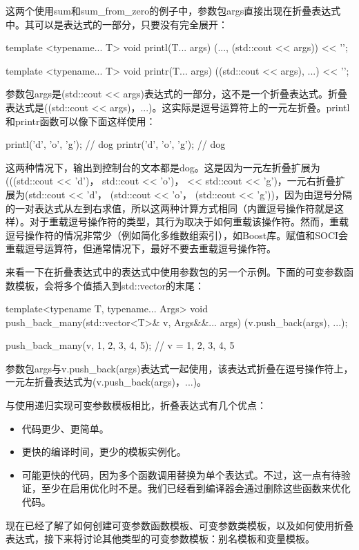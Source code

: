 这两个使用sum和sum\_from\_zero的例子中，参数包args直接出现在折叠表达式中。其可以是表达式的一部分，只要没有完全展开：

\begin{cpp}
template <typename... T>
void printl(T... args)
{
	(..., (std::cout << args)) << '\n';
}

template <typename... T>
void printr(T... args)
{
	((std::cout << args), ...) << '\n';
}
\end{cpp}

参数包args是(std::cout <{}< args)表达式的一部分，这不是一个折叠表达式。折叠表达式是((std::cout <{}< args)，...)。这实际是逗号运算符上的一元左折叠。printl和printr函数可以像下面这样使用：

\begin{cpp}
printl('d', 'o', 'g'); // dog
printr('d', 'o', 'g'); // dog
\end{cpp}

这两种情况下，输出到控制台的文本都是dog。这是因为一元左折叠扩展为(((std::cout <{}< 'd')， std::cout <{}< 'o')， << std::cout <{}< 'g')，一元右折叠扩展为(std::cout <{}< 'd'， (std::cout <{}< 'o'， (std::cout <{}< 'g'))，因为由逗号分隔的一对表达式从左到右求值，所以这两种计算方式相同（内置逗号操作符就是这样）。对于重载逗号操作符的类型，其行为取决于如何重载该操作符。然而，重载逗号操作符的情况非常少（例如简化多维数组索引），如Boost库。赋值和SOCI会重载逗号运算符，但通常情况下，最好不要去重载逗号操作符。

来看一下在折叠表达式中的表达式中使用参数包的另一个示例。下面的可变参数函数模板，会将多个值插入到std::vector的末尾：

\begin{cpp}
template<typename T, typename... Args>
void push_back_many(std::vector<T>& v, Args&&... args)
{
	(v.push_back(args), ...);
}

push_back_many(v, 1, 2, 3, 4, 5); // v = {1, 2, 3, 4, 5}
\end{cpp}

参数包args与v.push\_back(args)表达式一起使用，该表达式折叠在逗号操作符上，一元左折叠表达式为(v.push\_back(args)，...)。

与使用递归实现可变参数模板相比，折叠表达式有几个优点：

\begin{itemize}
  \item 代码更少、更简单。

  \item 更快的编译时间，更少的模板实例化。

  \item 可能更快的代码，因为多个函数调用替换为单个表达式。不过，这一点有待验证，至少在启用优化时不是。我们已经看到编译器会通过删除这些函数来优化代码。
\end{itemize}

现在已经了解了如何创建可变参数函数模板、可变参数类模板，以及如何使用折叠表达式，接下来将讨论其他类型的可变参数模板：别名模板和变量模板。




















